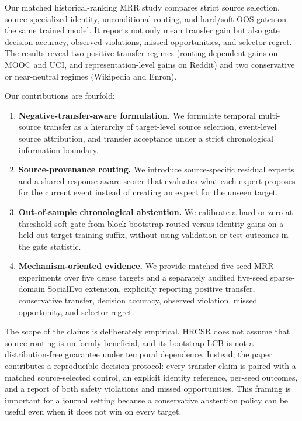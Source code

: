 \documentclass[journal]{IEEEtran}
\begin{document}
Our matched historical-ranking MRR study compares strict source selection, source-specialized identity, unconditional routing, and hard/soft OOS gates on the same trained model. It reports not only mean transfer gain but also gate decision accuracy, observed violations, missed opportunities, and selector regret. The results reveal two positive-transfer regimes (routing-dependent gains on MOOC and UCI, and representation-level gains on Reddit) and two conservative or near-neutral regimes (Wikipedia and Enron).

Our contributions are fourfold:
\begin{enumerate}
    \item \textbf{Negative-transfer-aware formulation.} We formulate temporal multi-source transfer as a hierarchy of target-level source selection, event-level source attribution, and transfer acceptance under a strict chronological information boundary.
    \item \textbf{Source-provenance routing.} We introduce source-specific residual experts and a shared response-aware scorer that evaluates what each expert proposes for the current event instead of creating an expert for the unseen target.
    \item \textbf{Out-of-sample chronological abstention.} We calibrate a hard or zero-at-threshold soft gate from block-bootstrap routed-versus-identity gains on a held-out target-training suffix, without using validation or test outcomes in the gate statistic.
    \item \textbf{Mechanism-oriented evidence.} We provide matched five-seed MRR experiments over five dense targets and a separately audited five-seed sparse-domain SocialEvo extension, explicitly reporting positive transfer, conservative transfer, decision accuracy, observed violation, missed opportunity, and selector regret.
\end{enumerate}

The scope of the claims is deliberately empirical. HRCSR does not assume that source routing is uniformly beneficial, and its bootstrap LCB is not a distribution-free guarantee under temporal dependence. Instead, the paper contributes a reproducible decision protocol: every transfer claim is paired with a matched source-selected control, an explicit identity reference, per-seed outcomes, and a report of both safety violations and missed opportunities. This framing is important for a journal setting because a conservative abstention policy can be useful even when it does not win on every target.
\end{document}
